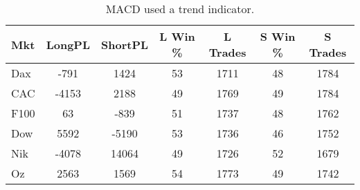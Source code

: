 \begin{table}[ht]
\centering
\caption[MACD as Trend Indicator]{MACD used a trend indicator.} 
\label{tab:mac_trend_results}
\begin{tabular}{lcccccc}
  \toprule Mkt & LongPL & ShortPL & L Win \% & L Trades & S Win \% & S Trades \\ 
  \midrule Dax & -791 & 1424 & 53 & 1711 & 48 & 1784 \\ 
  CAC & -4153 & 2188 & 49 & 1769 & 49 & 1784 \\ 
  F100 & 63 & -839 & 51 & 1737 & 48 & 1762 \\ 
  Dow & 5592 & -5190 & 53 & 1736 & 46 & 1752 \\ 
  Nik & -4078 & 14064 & 49 & 1726 & 52 & 1679 \\ 
  Oz & 2563 & 1569 & 54 & 1773 & 49 & 1742 \\ 
   \bottomrule \end{tabular}
\end{table}
